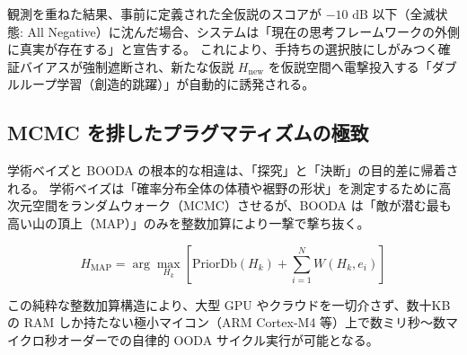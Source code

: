 観測を重ねた結果、事前に定義された全仮説のスコアが $-10\text{ dB}$ 以下（全滅状態: All Negative）に沈んだ場合、システムは「現在の思考フレームワークの外側に真実が存在する」と宣告する。
これにより、手持ちの選択肢にしがみつく確証バイアスが強制遮断され、新たな仮説 $H_{\text{new}}$ を仮説空間へ電撃投入する「ダブルループ学習（創造的跳躍）」が自動的に誘発される。

\subsection{MCMC を排したプラグマティズムの極致}

学術ベイズと BOODA の根本的な相違は、「探究」と「決断」の目的差に帰着される。
学術ベイズは「確率分布全体の体積や裾野の形状」を測定するために高次元空間をランダムウォーク（MCMC）させるが、BOODA は「敵が潜む最も高い山の頂上（MAP）」のみを整数加算により一撃で撃ち抜く。

\begin{equation}
  H_{\text{MAP}} = \arg\max_{H_k} \left[ \text{PriorDb}(H_k) + \sum_{i=1}^{N} W(H_k, e_i) \right]
\end{equation}

この純粋な整数加算構造により、大型 GPU やクラウドを一切介さず、数十KB の RAM しか持たない極小マイコン（ARM Cortex-M4 等）上で数ミリ秒〜数マイクロ秒オーダーでの自律的 OODA サイクル実行が可能となる。
